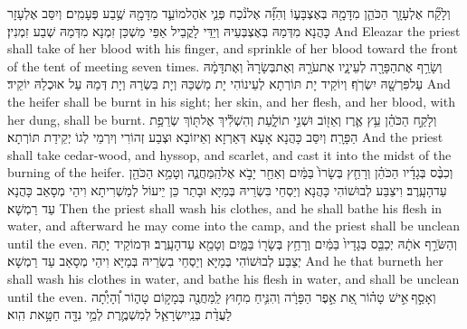 {וְלָקַ֞ח אֶלְעָזָ֧ר הַכֹּהֵ֛ן מִדָּמָ֖הּ בְּאֶצְבָּע֑וֹ וְהִזָּ֞ה אֶל\maqqaf נֹ֨כַח פְּנֵ֧י אֹֽהֶל\maqqaf מוֹעֵ֛ד מִדָּמָ֖הּ שֶׁ֥בַע פְּעָמִֽים׃}
{וְיִסַּב אֶלְעָזָר כָּהֲנָא מִדְּמַהּ בְּאֶצְבְּעֵיהּ וְיַדֵּי לָקֳבֵיל אַפֵּי מַשְׁכַּן זִמְנָא מִדְּמַהּ שְׁבַע זִמְנִין׃}
{And Eleazar the priest shall take of her blood with his finger, and sprinkle of her blood toward the front of the tent of meeting seven times.}{}
{וְשָׂרַ֥ף אֶת\maqqaf הַפָּרָ֖ה לְעֵינָ֑יו אֶת\maqqaf עֹרָ֤הּ וְאֶת\maqqaf בְּשָׂרָהּ֙ וְאֶת\maqqaf דָּמָ֔הּ עַל\maqqaf פִּרְשָׁ֖הּ יִשְׂרֹֽף׃}
{וְיוֹקֵיד יָת תּוֹרְתָא לְעֵינוֹהִי יָת מַשְׁכַּהּ וְיָת בִּשְׂרַהּ וְיָת דְּמַהּ עַל אוּכְלַהּ יוֹקֵיד׃}
{And the heifer shall be burnt in his sight; her skin, and her flesh, and her blood, with her dung, shall be burnt.}{}
{וְלָקַ֣ח הַכֹּהֵ֗ן עֵ֥ץ אֶ֛רֶז וְאֵז֖וֹב וּשְׁנִ֣י תוֹלָ֑עַת וְהִשְׁלִ֕יךְ אֶל\maqqaf תּ֖וֹךְ שְׂרֵפַ֥ת הַפָּרָֽה׃}
{וְיִסַּב כָּהֲנָא אָעָא דְּאַרְזָא וְאֵיזוֹבָא וּצְבַע זְהוֹרִי וְיִרְמֵי לְגוֹ יְקֵידַת תּוֹרְתָא׃}
{And the priest shall take cedar-wood, and hyssop, and scarlet, and cast it into the midst of the burning of the heifer.}{}
{וְכִבֶּ֨ס בְּגָדָ֜יו הַכֹּהֵ֗ן וְרָחַ֤ץ בְּשָׂרוֹ֙ בַּמַּ֔יִם וְאַחַ֖ר יָבֹ֣א אֶל\maqqaf הַֽמַּחֲנֶ֑ה וְטָמֵ֥א הַכֹּהֵ֖ן עַד\maqqaf הָעָֽרֶב׃}
{וִיצַבַּע לְבוּשׁוֹהִי כָּהֲנָא וְיַסְחֵי בִּשְׂרֵיהּ בְּמַיָּא וּבָתַר כֵּן יֵיעוֹל לְמַשְׁרִיתָא וִיהֵי מְסָאַב כָּהֲנָא עַד רַמְשָׁא׃}
{Then the priest shall wash his clothes, and he shall bathe his flesh in water, and afterward he may come into the camp, and the priest shall be unclean until the even.}{}
{וְהַשֹּׂרֵ֣ף אֹתָ֔הּ יְכַבֵּ֤ס בְּגָדָיו֙ בַּמַּ֔יִם וְרָחַ֥ץ בְּשָׂר֖וֹ בַּמָּ֑יִם וְטָמֵ֖א עַד\maqqaf הָעָֽרֶב׃}
{וּדְמוֹקֵיד יָתַהּ יְצַבַּע לְבוּשׁוֹהִי בְּמַיָּא וְיַסְחֵי בִשְׂרֵיהּ בְּמַיָּא וִיהֵי מְסָאַב עַד רַמְשָׁא׃}
{And he that burneth her shall wash his clothes in water, and bathe his flesh in water, and shall be unclean until the even.}{}
{וְאָסַ֣ף \legarmeh  אִ֣ישׁ טָה֗וֹר אֵ֚ת אֵ֣פֶר הַפָּרָ֔ה וְהִנִּ֛יחַ מִח֥וּץ לַֽמַּחֲנֶ֖ה בְּמָק֣וֹם טָה֑וֹר וְ֠הָיְתָ֠ה לַעֲדַ֨ת בְּנֵֽי\maqqaf יִשְׂרָאֵ֧ל לְמִשְׁמֶ֛רֶת לְמֵ֥י נִדָּ֖ה חַטָּ֥את הִֽוא׃}
